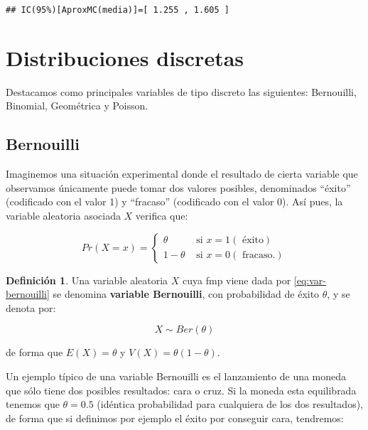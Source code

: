 \documentclass[
]{book}
\newenvironment{yellowbox}{
  \definecolor{shadecolor}{rgb}{210, 180, 140}  
  \color{black}
  \begin{shaded}}
 {\end{shaded}}
\theoremstyle{definition}
\newtheorem{definition}{Definición}[chapter]
\theoremstyle{definition}
\theoremstyle{definition}
\theoremstyle{definition}
\theoremstyle{remark}
\begin{document}
\begin{verbatim}
## IC(95%)[AproxMC(media)]=[ 1.255 , 1.605 ]
\end{verbatim}

\hypertarget{distribuciones-discretas}{%
\section{Distribuciones discretas}\label{distribuciones-discretas}}

Destacamos como principales variables de tipo discreto las siguientes: Bernouilli, Binomial, Geométrica y Poisson.

\hypertarget{bernouilli}{%
\subsection{Bernouilli}\label{bernouilli}}

Imaginemos una situación experimental donde el resultado de cierta variable que observamos únicamente puede tomar dos valores posibles, denominados ``éxito'' (codificado con el valor 1) y ``fracaso'' (codificado con el valor 0). Así pues, la variable aleatoria asociada \(X\) verifica que:

\begin{equation}
Pr(X = x) = 
\begin{cases}
\theta & \text{ si } x = 1 (\text{ éxito})\\
1- \theta & \text{ si } x = 0 (\text{ fracaso.})
\end{cases}
\label{eq:var-bernouilli}
\end{equation}

\begin{yellowbox}

\begin{definition}
\protect\hypertarget{def:vber}{}\label{def:vber}Una variable aleatoria \(X\) cuya fmp viene dada por \eqref{eq:var-bernouilli} se denomina \textbf{variable Bernouilli}, con probabilidad de éxito \(\theta\), y se denota por:

\[X \sim Ber(\theta)\]

de forma que \(E(X) = \theta\) y \(V(X) = \theta(1-\theta).\)
\end{definition}

\end{yellowbox}

Un ejemplo típico de una variable Bernouilli es el lanzamiento de una moneda que sólo tiene dos posibles resultados: cara o cruz. Si la moneda esta equilibrada tenemos que \(\theta = 0.5\) (idéntica probabilidad para cualquiera de los dos resultados), de forma que si definimos por ejemplo el éxito por conseguir cara, tendremos:
\end{document}
